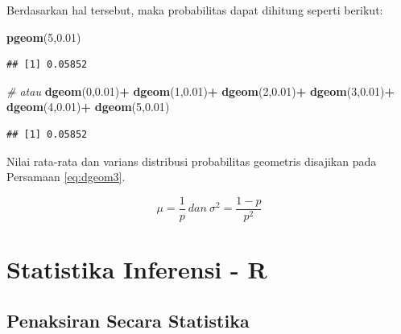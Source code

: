 \documentclass[]{book}
\newenvironment{Shaded}{\begin{snugshade}}{\end{snugshade}}
\newcommand{\KeywordTok}[1]{\textcolor[rgb]{0.13,0.29,0.53}{\textbf{#1}}}
\newcommand{\DecValTok}[1]{\textcolor[rgb]{0.00,0.00,0.81}{#1}}
\newcommand{\FloatTok}[1]{\textcolor[rgb]{0.00,0.00,0.81}{#1}}
\newcommand{\StringTok}[1]{\textcolor[rgb]{0.31,0.60,0.02}{#1}}
\newcommand{\CommentTok}[1]{\textcolor[rgb]{0.56,0.35,0.01}{\textit{#1}}}
\newcommand{\OperatorTok}[1]{\textcolor[rgb]{0.81,0.36,0.00}{\textbf{#1}}}
\newcommand{\NormalTok}[1]{#1}
\begin{document}
Berdasarkan hal tersebut, maka probabilitas dapat dihitung seperti
berikut:

\begin{Shaded}
\begin{Highlighting}[]
\KeywordTok{pgeom}\NormalTok{(}\DecValTok{5}\NormalTok{,}\FloatTok{0.01}\NormalTok{)}
\end{Highlighting}
\end{Shaded}

\begin{verbatim}
## [1] 0.05852
\end{verbatim}

\begin{Shaded}
\begin{Highlighting}[]
\CommentTok{# atau}
\KeywordTok{dgeom}\NormalTok{(}\DecValTok{0}\NormalTok{,}\FloatTok{0.01}\NormalTok{)}\OperatorTok{+}
\StringTok{  }\KeywordTok{dgeom}\NormalTok{(}\DecValTok{1}\NormalTok{,}\FloatTok{0.01}\NormalTok{)}\OperatorTok{+}
\StringTok{  }\KeywordTok{dgeom}\NormalTok{(}\DecValTok{2}\NormalTok{,}\FloatTok{0.01}\NormalTok{)}\OperatorTok{+}
\StringTok{  }\KeywordTok{dgeom}\NormalTok{(}\DecValTok{3}\NormalTok{,}\FloatTok{0.01}\NormalTok{)}\OperatorTok{+}
\StringTok{  }\KeywordTok{dgeom}\NormalTok{(}\DecValTok{4}\NormalTok{,}\FloatTok{0.01}\NormalTok{)}\OperatorTok{+}
\StringTok{  }\KeywordTok{dgeom}\NormalTok{(}\DecValTok{5}\NormalTok{,}\FloatTok{0.01}\NormalTok{)}
\end{Highlighting}
\end{Shaded}

\begin{verbatim}
## [1] 0.05852
\end{verbatim}

Nilai rata-rata dan varians distribusi probabilitas geometris disajikan
pada Persamaan \eqref{eq:dgeom3}.

\begin{equation}
   \mu=\frac{1}{p}\ dan\ \sigma^2=\frac{1-p}{p^2}
  \label{eq:dgeom3}
\end{equation}

\part*{Statistika Inferensi -
R}\label{part-statistika-inferensi---r}

\chapter{Penaksiran Secara
Statistika}\label{penaksiran-secara-statistika}
\end{document}
